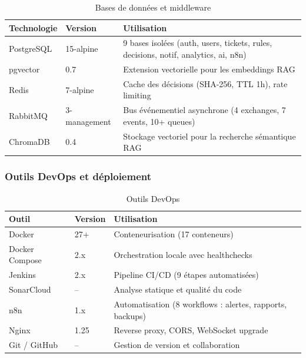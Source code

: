 \begin{table}[H]
\centering
\caption{Bases de donn\'{e}es et middleware}
\label{tab:bdd_middleware}
\begin{tabular}{|p{3.5cm}|p{2cm}|p{7.5cm}|}
\hline
\textbf{Technologie} & \textbf{Version} & \textbf{Utilisation} \\
\hline
PostgreSQL & 15-alpine & 9 bases isol\'{e}es (auth, users, tickets, rules, decisions, notif, analytics, ai, n8n) \\
\hline
pgvector & 0.7 & Extension vectorielle pour les embeddings RAG \\
\hline
Redis & 7-alpine & Cache des d\'{e}cisions (SHA-256, TTL 1h), rate limiting \\
\hline
RabbitMQ & 3-management & Bus \'{e}v\'{e}nementiel asynchrone (4 exchanges, 7 events, 10+ queues) \\
\hline
ChromaDB & 0.4 & Stockage vectoriel pour la recherche s\'{e}mantique RAG \\
\hline
\end{tabular}
\end{table}

\subsubsection{Outils DevOps et d\'{e}ploiement}

\begin{table}[H]
\centering
\caption{Outils DevOps}
\label{tab:devops}
\begin{tabular}{|p{3.5cm}|p{2cm}|p{7.5cm}|}
\hline
\textbf{Outil} & \textbf{Version} & \textbf{Utilisation} \\
\hline
Docker & 27+ & Conteneurisation (17 conteneurs) \\
\hline
Docker Compose & 2.x & Orchestration locale avec healthchecks \\
\hline
Jenkins & 2.x & Pipeline CI/CD (9 \'{e}tapes automatis\'{e}es) \\
\hline
SonarCloud & -- & Analyse statique et qualit\'{e} du code \\
\hline
n8n & 1.x & Automatisation (8 workflows : alertes, rapports, backups) \\
\hline
Nginx & 1.25 & Reverse proxy, CORS, WebSocket upgrade \\
\hline
Git / GitHub & -- & Gestion de version et collaboration \\
\hline
\end{tabular}
\end{table}

